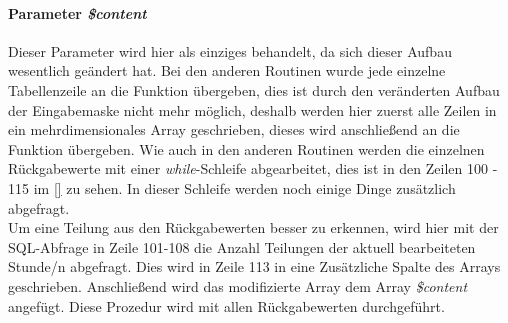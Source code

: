 \paragraph{Parameter \textit{\$content}}
Dieser Parameter wird hier als einziges behandelt, da sich dieser Aufbau wesentlich geändert hat. Bei den anderen Routinen wurde jede einzelne Tabellenzeile an die Funktion übergeben, dies ist durch den veränderten Aufbau der Eingabemaske nicht mehr möglich, deshalb werden hier zuerst alle Zeilen in ein mehrdimensionales Array geschrieben, dieses wird anschließend an die Funktion übergeben. Wie auch in den anderen Routinen werden die einzelnen Rückgabewerte mit einer \textit{while}-Schleife abgearbeitet, dies ist in den Zeilen 100 - 115 im \autoref{} zu sehen. In dieser Schleife werden noch einige Dinge zusätzlich abgefragt.\\
Um eine Teilung aus den Rückgabewerten besser zu erkennen, wird hier mit der SQL-Abfrage in Zeile 101-108 die Anzahl Teilungen der aktuell bearbeiteten Stunde/n abgefragt. Dies wird in Zeile 113 in eine Zusätzliche Spalte des Arrays geschrieben. Anschließend wird das modifizierte Array dem Array \textit{\$content} angefügt. Diese Prozedur wird mit allen Rückgabewerten durchgeführt.\\

